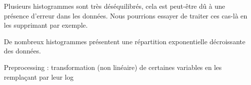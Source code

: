 \documentclass[12pt]{article}
\renewcommand{\cite}{\parencite}
\newcommand\mimic{\texttt{MIMIC-III} }
\begin{document}
Plusieurs histogrammes sont très déséquilibrés, cela est peut-être dû à une présence d'erreur dans les
données. Nous pourrions essayer de traiter ces cas-là en les supprimant par exemple.

De nombreux histogrammes présentent une répartition exponentielle décroissante des données.

Preprocessing : transformation (non linéaire) de certaines variables en les remplaçant par leur log


%
%
%
\end{document}
